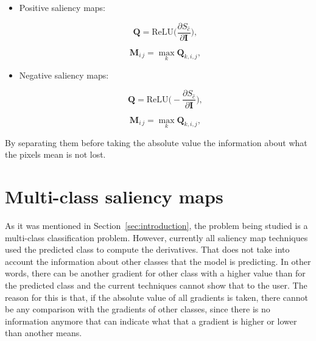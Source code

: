 \documentclass[preprint,12pt]{elsarticle}
\begin{document}
\begin{itemize}
    \item Positive saliency maps:
    
    \begin{equation}
        \boldsymbol{Q} = \text{ReLU} \bigg (\frac{\partial S_{\hat{c}}}{\partial \boldsymbol{I}} \bigg ),
        \label{eq: 2d positive saliency map}
    \end{equation}

    \begin{equation}
        \boldsymbol{M}_{i\, j} = \max_{k} \boldsymbol{Q}_{k, i, j},
        \label{eq: 3d positive saliency map}
    \end{equation}

    \item Negative saliency maps:
    
    \begin{equation}
        \boldsymbol{Q} = \text{ReLU} \bigg (-\frac{\partial S_{\hat{c}}}{\partial \boldsymbol{I}} \bigg ),
        \label{eq: 2d negative saliency map}
    \end{equation}

    \begin{equation}
        \boldsymbol{M}_{i\, j} = \max_{k} \boldsymbol{Q}_{k, i, j},
        \label{eq: 3d negative saliency map}
    \end{equation}

\end{itemize}

By separating them before taking the absolute value the information about what the pixels mean is not lost. 

\section{Multi-class saliency maps}
\label{sec:multi-class saliency map}
As it was mentioned in Section~\ref{sec:introduction}, the problem being studied is a multi-class classification problem. However, currently all saliency map techniques used the predicted class to compute the derivatives. That does not take into account the information about other classes that the model is predicting. In other words, there can be another gradient for other class with a higher value than for the predicted class and the current techniques cannot show that to the user. The reason for this is that, if the absolute value of all gradients is taken, there cannot be any comparison with the gradients of other classes, since there is no information anymore that can indicate what that a gradient is higher or lower than another means.
\end{document}
